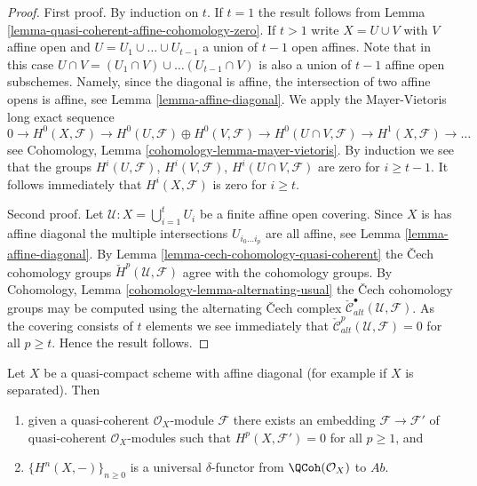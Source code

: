 \begin{proof}
First proof.
By induction on $t$.
If $t = 1$ the result follows from
Lemma \ref{lemma-quasi-coherent-affine-cohomology-zero}.
If $t > 1$ write $X = U \cup V$ with $V$ affine open and
$U = U_1 \cup \ldots \cup U_{t - 1}$ a union of $t - 1$ open affines.
Note that in this case
$U \cap V =  (U_1 \cap V) \cup \ldots (U_{t - 1} \cap V)$
is also a union of $t - 1$ affine open subschemes.
Namely, since the diagonal is affine, the intersection of two
affine opens is affine, see Lemma \ref{lemma-affine-diagonal}.
We apply the Mayer-Vietoris long exact sequence
$$
0 \to
H^0(X, \mathcal{F}) \to
H^0(U, \mathcal{F}) \oplus H^0(V, \mathcal{F}) \to
H^0(U \cap V, \mathcal{F}) \to
H^1(X, \mathcal{F}) \to \ldots
$$
see Cohomology, Lemma \ref{cohomology-lemma-mayer-vietoris}.
By induction we see that the groups $H^i(U, \mathcal{F})$,
$H^i(V, \mathcal{F})$, $H^i(U \cap V, \mathcal{F})$ are zero for
$i \geq t - 1$. It follows immediately that $H^i(X, \mathcal{F})$
is zero for $i \geq t$.

\medskip\noindent
Second proof.
Let $\mathcal{U} : X = \bigcup_{i = 1}^t U_i$ be a finite affine open
covering. Since $X$ is has affine diagonal the multiple intersections
$U_{i_0 \ldots i_p}$ are all affine, see
Lemma \ref{lemma-affine-diagonal}.
By Lemma \ref{lemma-cech-cohomology-quasi-coherent} the {\v C}ech
cohomology groups $\check{H}^p(\mathcal{U}, \mathcal{F})$
agree with the cohomology groups. By
Cohomology, Lemma \ref{cohomology-lemma-alternating-usual}
the {\v C}ech cohomology groups may be computed using the alternating
{\v C}ech complex $\check{\mathcal{C}}_{alt}^\bullet(\mathcal{U}, \mathcal{F})$.
As the covering consists of $t$ elements we see immediately
that $\check{\mathcal{C}}_{alt}^p(\mathcal{U}, \mathcal{F}) = 0$
for all $p \geq t$. Hence the result follows.
\end{proof}

\begin{lemma}
\label{lemma-affine-diagonal-universal-delta-functor}
Let $X$ be a quasi-compact scheme with affine diagonal
(for example if $X$ is separated). Then
\begin{enumerate}
\item given a quasi-coherent $\mathcal{O}_X$-module $\mathcal{F}$
there exists an embedding $\mathcal{F} \to \mathcal{F}'$ of
quasi-coherent $\mathcal{O}_X$-modules
such that $H^p(X, \mathcal{F}') = 0$ for all $p \geq 1$, and
\item $\{H^n(X, -)\}_{n \geq 0}$
is a universal $\delta$-functor from $\QCoh(\mathcal{O}_X)$ to
$\textit{Ab}$.
\end{enumerate}
\end{lemma}

